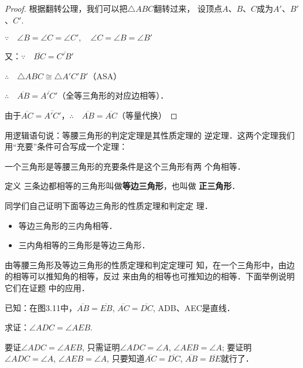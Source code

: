 \begin{proof}
    根据翻转公理，我们可以把$\triangle ABC$翻转过来，
    设顶点$A$、$B$、$C$成为$A'$、$B'$、$C'$.
    
    $\because\quad \angle B=\angle C=\angle C',\quad \angle C=\angle B=\angle B'$

    又：$\because\quad \overline{BC}=\overline{C'B'}$

    $\therefore\quad \triangle ABC\cong \triangle A'C'B'$（ASA）

    $\therefore\quad \overline{AB}=\overline{A'C'}$（全等三角形的对应边相等）．

由于$\overline{AC}=\overline{A'C'}$，$\therefore\quad \overline{AB}=\overline{AC}$（等量代换）
\end{proof}

用逻辑语句说：等腰三角形的判定定理是其性质定理的
逆定理．这两个定理我们用“充要”条件可合写成一个定理：

\begin{blk}{}
   一个三角形是等腰三角形的充要条件是这个三角形有两
个角相等．
\end{blk}


\begin{blk}{定义}
    三条边都相等的三角形叫做\textbf{等边三角形}，也叫做
    \textbf{正三角形}．
\end{blk}


同学们自己证明下面等边三角形的性质定理和判定定
理．

\begin{blk}{}
    \begin{itemize}
        \item 等边三角形的三内角相等．
        \item   三内角相等的三角形是等边三角形．
    \end{itemize}
\end{blk}

由等腰三角形及等边三角形的性质定理和判定定理可
知，在一个三角形中，由边的相等可以推知角的相等，反过
来由角的相等也可推知边的相等．下面举例说明它们在证题
中的应用．

\begin{example}
已知：在图3.11中，$\overline{AB}=\overline{EB}$, 
$\overline{AC}=\overline{DC}$, 
ADB、AEC是直线．

求证：$\angle ADC=\angle AEB$.
\end{example}

\begin{analyze}
    要证$\angle ADC=\angle AEB$,
只需证明$\angle ADC=\angle A$, $\angle AEB=\angle A$; 要证明
$\angle ADC=\angle A$, $\angle AEB=\angle A$, 只要知道$\overline{AC}=\overline{DC}$, 
$\overline{AB}=\overline{BE}$就行了．
\end{analyze}

